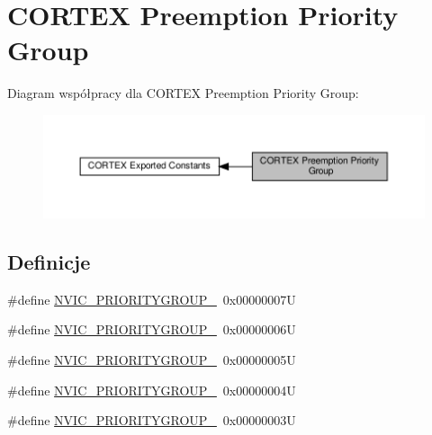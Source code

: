 \hypertarget{group___c_o_r_t_e_x___preemption___priority___group}{}\section{C\+O\+R\+T\+EX Preemption Priority Group}
\label{group___c_o_r_t_e_x___preemption___priority___group}
Diagram współpracy dla C\+O\+R\+T\+EX Preemption Priority Group\+:\nopagebreak
\begin{figure}[H]
\begin{center}
\leavevmode
\includegraphics[width=350pt]{group___c_o_r_t_e_x___preemption___priority___group}
\end{center}
\end{figure}
\subsection*{Definicje}
\begin{DoxyCompactItemize}
\item 
\#define \hyperlink{group___c_o_r_t_e_x___preemption___priority___group_ga5e97dcff77680602c86e44f23f5ffa1a}{N\+V\+I\+C\+\_\+\+P\+R\+I\+O\+R\+I\+T\+Y\+G\+R\+O\+U\+P\+\_}~0x00000007U
\item 
\#define \hyperlink{group___c_o_r_t_e_x___preemption___priority___group_ga702227137b010421c3a3b6434005a132}{N\+V\+I\+C\+\_\+\+P\+R\+I\+O\+R\+I\+T\+Y\+G\+R\+O\+U\+P\+\_}~0x00000006U
\item 
\#define \hyperlink{group___c_o_r_t_e_x___preemption___priority___group_gaa43a3fd37850c120ce567ab2743d11b4}{N\+V\+I\+C\+\_\+\+P\+R\+I\+O\+R\+I\+T\+Y\+G\+R\+O\+U\+P\+\_}~0x00000005U
\item 
\#define \hyperlink{group___c_o_r_t_e_x___preemption___priority___group_ga8ddb24962e6f0fc3273139d45d374b09}{N\+V\+I\+C\+\_\+\+P\+R\+I\+O\+R\+I\+T\+Y\+G\+R\+O\+U\+P\+\_}~0x00000004U
\item 
\#define \hyperlink{group___c_o_r_t_e_x___preemption___priority___group_gae6eab9140204bc938255aa148e597c45}{N\+V\+I\+C\+\_\+\+P\+R\+I\+O\+R\+I\+T\+Y\+G\+R\+O\+U\+P\+\_}~0x00000003U
\end{DoxyCompactItemize}


